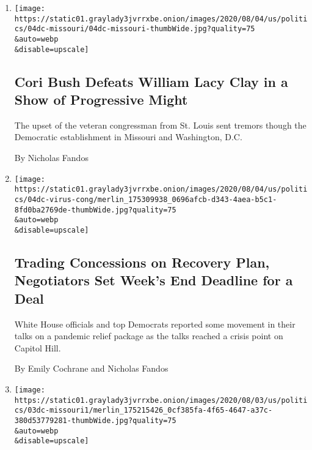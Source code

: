 \begin{enumerate}
\def\labelenumi{\arabic{enumi}.}
\item
  \href{/2020/08/05/us/politics/cori-bush-missouri-william-lacy-clay.html}{}

  \texttt{[image: https://static01.graylady3jvrrxbe.onion/images/2020/08/04/us/politics/04dc-missouri/04dc-missouri-thumbWide.jpg?quality=75\\\&auto=webp\\\&disable=upscale]}

  \hypertarget{cori-bush-defeats-william-lacy-clay-in-a-show-of-progressive-might}{%
  \subsection{Cori Bush Defeats William Lacy Clay in a Show of
  Progressive
  Might}\label{cori-bush-defeats-william-lacy-clay-in-a-show-of-progressive-might}}

  The upset of the veteran congressman from St. Louis sent tremors
  though the Democratic establishment in Missouri and Washington, D.C.

  By Nicholas Fandos
\item
  \href{/2020/08/04/us/politics/coronavirus-recovery-plan-negotiations.html}{}

  \texttt{[image: https://static01.graylady3jvrrxbe.onion/images/2020/08/04/us/politics/04dc-virus-cong/merlin\_175309938\_0696afcb-d343-4aea-b5c1-8fd0ba2769de-thumbWide.jpg?quality=75\\\&auto=webp\\\&disable=upscale]}

  \hypertarget{trading-concessions-on-recovery-plan-negotiators-set-weeks-end-deadline-for-a-deal}{%
  \subsection{Trading Concessions on Recovery Plan, Negotiators Set
  Week's End Deadline for a
  Deal}\label{trading-concessions-on-recovery-plan-negotiators-set-weeks-end-deadline-for-a-deal}}

  White House officials and top Democrats reported some movement in
  their talks on a pandemic relief package as the talks reached a crisis
  point on Capitol Hill.

  By Emily Cochrane and Nicholas Fandos
\item
  \href{/2020/08/02/us/politics/cori-bush-william-lacy-clay-missouri.html}{}

  \texttt{[image: https://static01.graylady3jvrrxbe.onion/images/2020/08/03/us/politics/03dc-missouri1/merlin\_175215426\_0cf385fa-4f65-4647-a37c-380d53779281-thumbWide.jpg?quality=75\\\&auto=webp\\\&disable=upscale]}


\end{enumerate}

